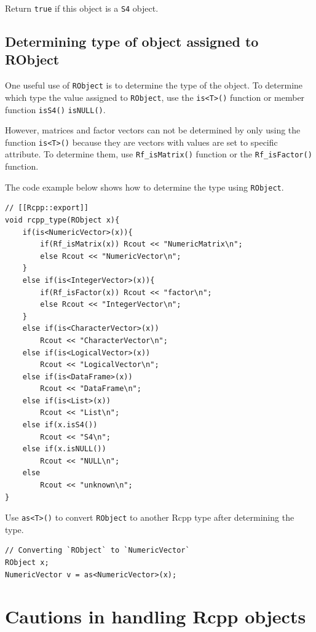 \documentclass[
]{book}
\begin{document}
Return \texttt{true} if this object is a \texttt{S4} object.

\hypertarget{determining-type-of-object-assigned-to-robject}{%
\section{Determining type of object assigned to RObject}\label{determining-type-of-object-assigned-to-robject}}

One useful use of \texttt{RObject} is to determine the type of the object. To determine which type the value assigned to \texttt{RObject}, use the \texttt{is\textless{}T\textgreater{}()} function or member function \texttt{isS4()} \texttt{isNULL()}.

However, matrices and factor vectors can not be determined by only using the function \texttt{is\textless{}T\textgreater{}()} because they are vectors with values are set to specific attribute. To determine them, use \texttt{Rf\_isMatrix()} function or the \texttt{Rf\_isFactor()} function.

The code example below shows how to determine the type using \texttt{RObject}.

\begin{verbatim}
// [[Rcpp::export]]
void rcpp_type(RObject x){
    if(is<NumericVector>(x)){
        if(Rf_isMatrix(x)) Rcout << "NumericMatrix\n";
        else Rcout << "NumericVector\n";       
    }
    else if(is<IntegerVector>(x)){
        if(Rf_isFactor(x)) Rcout << "factor\n";
        else Rcout << "IntegerVector\n";
    }
    else if(is<CharacterVector>(x))
        Rcout << "CharacterVector\n";
    else if(is<LogicalVector>(x))
        Rcout << "LogicalVector\n";
    else if(is<DataFrame>(x))
        Rcout << "DataFrame\n";
    else if(is<List>(x))
        Rcout << "List\n";
    else if(x.isS4())
        Rcout << "S4\n";
    else if(x.isNULL())
        Rcout << "NULL\n";
    else
        Rcout << "unknown\n";
}
\end{verbatim}

Use \texttt{as\textless{}T\textgreater{}()} to convert \texttt{RObject} to another Rcpp type after determining the type.

\begin{verbatim}
// Converting `RObject` to `NumericVector`
RObject x;
NumericVector v = as<NumericVector>(x);
\end{verbatim}

\hypertarget{cautions-in-handling-rcpp-objects}{%
\chapter{Cautions in handling Rcpp objects}\label{cautions-in-handling-rcpp-objects}}
\end{document}
